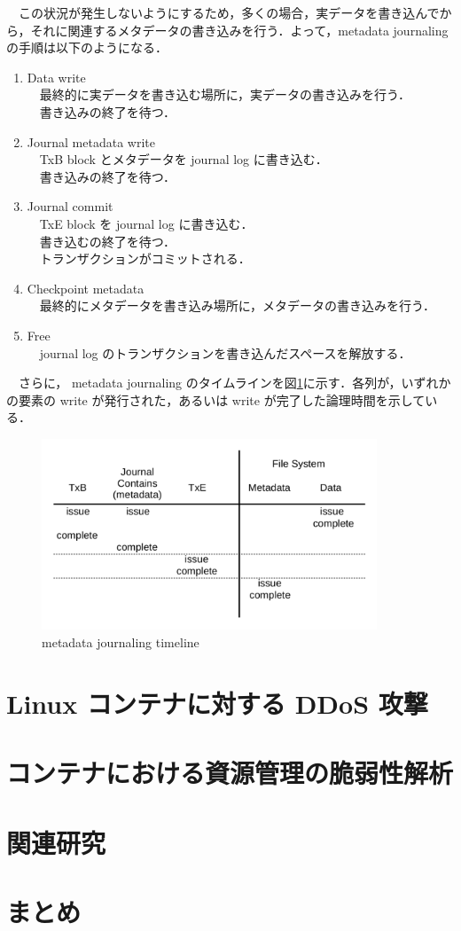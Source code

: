 \documentclass[graduation-thesis]{jsarticle}
\begin{document}
　この状況が発生しないようにするため，多くの場合，実データを書き込んでから，それに関連するメタデータの書き込みを行う．よって，metadata journaling の手順は以下のようになる．\\
\begin{enumerate}
	\item{Data write}\\
	　最終的に実データを書き込む場所に，実データの書き込みを行う．\\
	　書き込みの終了を待つ．
	\item{Journal metadata write}\\
	　TxB block とメタデータを journal log に書き込む．\\
	　書き込みの終了を待つ．
	\item{Journal commit}\\
	　TxE block を journal log に書き込む．\\
	　書き込むの終了を待つ．\\
	　トランザクションがコミットされる．
	\item{Checkpoint metadata}\\
	　最終的にメタデータを書き込み場所に，メタデータの書き込みを行う．\\
	\item{Free}\\
	　journal log のトランザクションを書き込んだスペースを解放する．\\
\end{enumerate}
　さらに， metadata journaling のタイムラインを図\ref{fig:timeline}に示す．各列が，いずれかの要素の write が発行された，あるいは write が完了した論理時間を示している．\\
\begin{figure}
	\begin{center}
		\includegraphics[width=10.0cm,clip]{images/timeline.pdf}
		\caption{metadata journaling timeline}
		\label{fig:timeline}
	\end{center}
\end{figure}

\clearpage
\section{Linux コンテナに対する DDoS 攻撃}
\label{sec:DDoS}

\clearpage
\section{コンテナにおける資源管理の脆弱性解析}
\label{sec:analysis}

\clearpage
\section{関連研究}
\label{sec:relative}

\clearpage
\section{まとめ}
\label{sec:conclusion}
\end{document}
